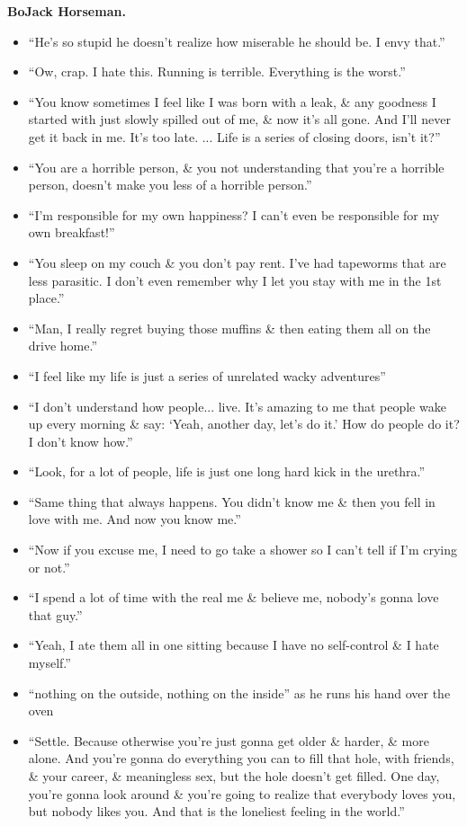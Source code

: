 \documentclass{article}
\begin{document}
\begin{enumerate}
    {\bf BoJack Horseman.}
    \begin{itemize}
    	\item ``He's so stupid he doesn't realize how miserable he should be. I envy that.''
    	\item ``Ow, crap. I hate this. Running is terrible. Everything is the worst.''
    	\item ``You know sometimes I feel like I was born with a leak, \& any goodness I started with just slowly spilled out of me, \& now it's all gone. And I'll never get it back in me. It's too late. ... Life is a series of closing doors, isn't it?''
    	\item``You are a horrible person, \& you not understanding that you're a horrible person, doesn't make you less of a horrible person.''
    	\item ``I'm responsible for my own happiness? I can't even be responsible for my own breakfast!''
    	\item ``You sleep on my couch \& you don't pay rent. I've had tapeworms that are less parasitic. I don't even remember why I let you stay with me in the 1st place.''
    	\item ``Man, I really regret buying those muffins \& then eating them all on the drive home.''
    	\item ``I feel like my life is just a series of unrelated wacky adventures''
    	\item ``I don't understand how people... live. It's amazing to me that people wake up every morning \& say: `Yeah, another day, let's do it.' How do people do it? I don't know how.''
    	\item ``Look, for a lot of people, life is just one long hard kick in the urethra.''
    	\item ``Same thing that always happens. You didn't know me \& then you fell in love with me. And now you know me.''
    	\item ``Now if you excuse me, I need to go take a shower so I can't tell if I'm crying or not.''
    	\item ``I spend a lot of time with the real me \& believe me, nobody's gonna love that guy.''
    	\item ``Yeah, I ate them all in one sitting because I have no self-control \& I hate myself.''
    	\item ``nothing on the outside, nothing on the inside'' as he runs his hand over the oven
    	\item ``Settle. Because otherwise you're just gonna get older \& harder, \& more alone. And you're gonna do everything you can to fill that hole, with friends, \& your career, \& meaningless sex, but the hole doesn't get filled. One day, you're gonna look around \& you're going to realize that everybody loves you, but nobody likes you. And that is the loneliest feeling in the world.''

\end{itemize}
\end{enumerate}
\end{document}
